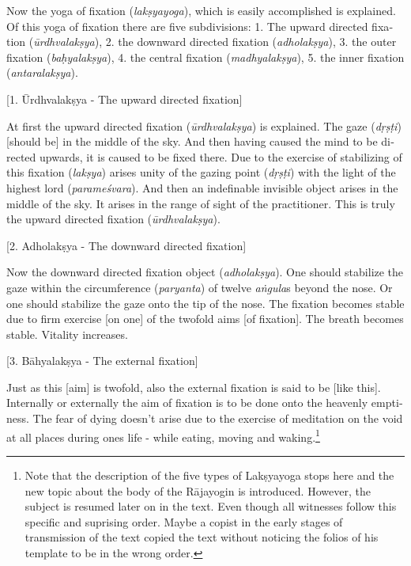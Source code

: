 \begin{otherlanguage}{english}
    \bigskip
 \begin{tlate}
   Now the yoga of fixation (\textit{lakṣyayoga}), which is easily accomplished is explained. Of this yoga of fixation there are five subdivisions:
   1. The upward directed fixation (\textit{ūrdhvalakṣya}),
   2. the downward directed fixation (\textit{adholakṣya}),
   3. the outer fixation (\textit{baḥyalakṣya}),
   4. the central fixation (\textit{madhyalakṣya}),
   5. the inner fixation (\textit{antaralakṣya}).
 \end{tlate}
     \bigskip
    \centerline{\textrm{\small{[1. Ūrdhvalakṣya - The upward directed fixation]}}}
    \bigskip    
  \begin{tlate}
At first the upward directed fixation (\textit{ūrdhvalakṣya}) is explained. The gaze (\textit{dṛṣṭi}) [should be] in the middle of the sky. And then having caused the mind to be directed upwards, it is caused to be fixed there. Due to the exercise of stabilizing of this fixation (\textit{lakṣya}) arises unity of the gazing point (\textit{dṛṣṭi}) with the light of the highest lord (\textit{parameśvara}). And then an indefinable invisible object arises in the middle of the sky. It arises in the range of sight of the practitioner. This is truly the upward directed fixation (\textit{ūrdhvalakṣya}).
  \end{tlate}
   \bigskip
    \centerline{\textrm{\small{[2. Adholakṣya - The downward directed fixation]}}}
    \bigskip
  \begin{tlate}
    Now the downward directed fixation object (\textit{adholakṣya}). One should stabilize the gaze within the circumference (\textit{paryanta}) of twelve \textit{aṅgula}s beyond the nose. Or one should stabilize the gaze onto the tip of the nose. The fixation becomes stable due to firm exercise [on one] of the twofold aims [of fixation]. The breath becomes stable. Vitality increases.
\end{tlate}
   \bigskip
    \centerline{\textrm{\small{[3. Bāhyalakṣya - The external fixation]}}}
    \bigskip
  \begin{tlate}
    Just as this [aim] is twofold, also the external fixation is said to be [like this]. Internally or externally the aim of fixation is to be done onto the heavenly emptiness. The fear of dying doesn't arise due to the exercise of meditation on the void at all places during ones life - while eating, moving and waking.\footnote{Note that the description of the five types of Lakṣyayoga stops here and the new topic about the body of the Rājayogin is introduced. However, the subject is resumed later on in the text. Even though all witnesses follow this specific and suprising order. Maybe a copist in the early stages of transmission of the text copied the text without noticing the folios of his template to be in the wrong order.}

\end{tlate}
\end{otherlanguage}
